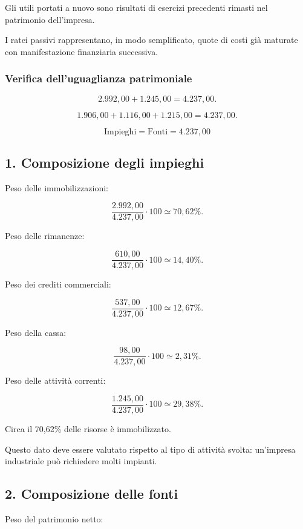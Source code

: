 \noindent Gli utili portati a nuovo
sono risultati di esercizi precedenti
rimasti nel patrimonio dell'impresa.

\noindent I ratei passivi rappresentano,
in modo semplificato,
quote di costi già maturate
con manifestazione finanziaria successiva.


\subsubsection*{Verifica dell'uguaglianza patrimoniale}

\[
2.992{,}00+1.245{,}00
=
4.237{,}00.
\]

\[
1.906{,}00+1.116{,}00+1.215{,}00
=
4.237{,}00.
\]

\[
\boxed{
\text{Impieghi}=\text{Fonti}=4.237{,}00
}
\]


\subsection*{1. Composizione degli impieghi}

\noindent Peso delle immobilizzazioni:

\[
\frac{2.992{,}00}{4.237{,}00}\cdot100
\simeq
\boxed{70{,}62\%}.
\]

\noindent Peso delle rimanenze:

\[
\frac{610{,}00}{4.237{,}00}\cdot100
\simeq
\boxed{14{,}40\%}.
\]

\noindent Peso dei crediti commerciali:

\[
\frac{537{,}00}{4.237{,}00}\cdot100
\simeq
\boxed{12{,}67\%}.
\]

\noindent Peso della cassa:

\[
\frac{98{,}00}{4.237{,}00}\cdot100
\simeq
\boxed{2{,}31\%}.
\]

\noindent Peso delle attività correnti:

\[
\frac{1.245{,}00}{4.237{,}00}\cdot100
\simeq
\boxed{29{,}38\%}.
\]

\noindent Circa il 70,62\%
delle risorse è immobilizzato.

\noindent Questo dato deve essere valutato
rispetto al tipo di attività svolta:
un'impresa industriale
può richiedere molti impianti.


\subsection*{2. Composizione delle fonti}

\noindent Peso del patrimonio netto:

